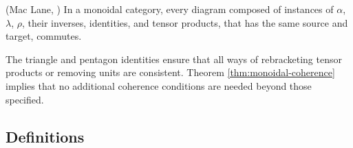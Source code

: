 \documentclass{article}
\begin{document}
\begin{theorem}
\label{thm:monoidal-coherence}
(Mac Lane, \cite{MacLane63}) In a monoidal category, every diagram composed of instances of $\alpha$, $\lambda$, $\rho$, their inverses, identities, and tensor products, that has the same source and target, commutes.
\end{theorem}

\begin{remark}
The triangle and pentagon identities ensure that all ways of rebracketing tensor products or removing units are consistent. Theorem \ref{thm:monoidal-coherence} implies that no additional coherence conditions are needed beyond those specified.
\end{remark}

\newpage
\subsection{Definitions}
\end{document}
